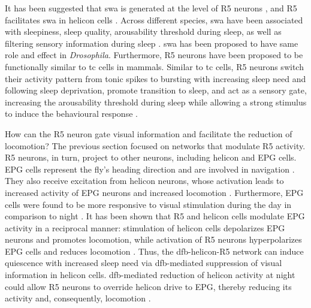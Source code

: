 \documentclass[../main.tex]{subfiles}
\begin{document}
It has been suggested that \gls{swa} is generated at the level of R5 neurons \cite{raccugliaNetworkSpecificSynchronizationElectrical2019}, and R5 facilitates \gls{swa} in helicon cells \cite{raccugliaCoherentMultilevelNetwork2022}. Across different species, \gls{swa} have been associated with sleepiness, sleep quality, arousability threshold during sleep, as well as filtering sensory information during sleep \cite{suarez-grimaltNeuralArchitectureSleep2021,raccugliaNetworkSpecificSynchronizationElectrical2019,raccugliaCoherentMultilevelNetwork2022}.
\gls{swa} has been proposed to have same role and effect in \textit{Drosophila}. Furthermore, R5 neurons have been proposed to be functionally similar to \gls{tc} cells in mammals. Similar to \gls{tc} cells, R5 neurons switch their activity pattern from tonic spikes to bursting  with increasing sleep need and following sleep deprivation, promote transition to sleep, and act as a sensory gate, increasing the arousability threshold during sleep while allowing a strong stimulus to induce the behavioural response
\cite{
    suarez-grimaltNeuralArchitectureSleep2021,
    raccugliaNetworkSpecificSynchronizationElectrical2019,
    raccugliaCoherentMultilevelNetwork2022,
    yanSubtypeSpecificRolesEllipsoid2023,
    gentThalamicDualControl2018}.

How can the R5 neuron gate visual information and facilitate the reduction of locomotion? The previous section focused on networks that modulate R5 activity. R5 neurons, in turn, project to other neurons, including helicon and EPG cells. EPG cells represent the fly's heading direction and are involved in navigation \cite{raccugliaCoherentMultilevelNetwork2022}. They also receive excitation from helicon neurons, whose activation leads to increased activity of EPG neurons and increased locomotion \cite{raccugliaCoherentMultilevelNetwork2022}.
Furthermore, EPG cells were found to be more responsive to visual stimulation during the day in comparison to night \cite{raccugliaCoherentMultilevelNetwork2022}.
It has been shown that R5 and helicon cells modulate EPG activity in a reciprocal manner: stimulation of helicon cells depolarizes EPG neurons and promotes locomotion, while activation of R5 neurons hyperpolarizes EPG cells and reduces locomotion \cite{raccugliaCoherentMultilevelNetwork2022}. Thus, the \gls{dfb}-helicon-R5 network can induce quiescence with increased sleep need via \gls{dfb}-mediated suppression of visual information in helicon cells.
\gls{dfb}-mediated reduction of helicon activity at night could allow R5 neurons to override helicon drive to EPG, thereby reducing its activity and, consequently, locomotion \cite{raccugliaCoherentMultilevelNetwork2022}.
\end{document}
